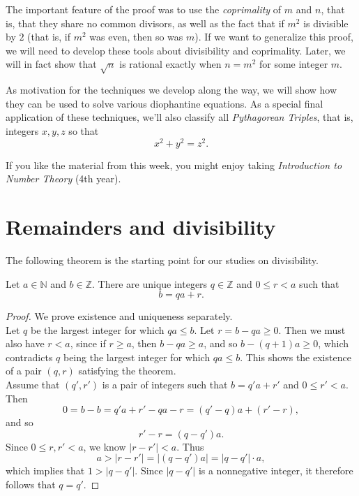 \documentclass[11pt,dvipsnames]{book}
\numberwithin{figure}{section} %
\numberwithin{table}{section} %
\begin{document}
The important feature of the proof was to use the {\it coprimality} of $m$ and $n$, that is, that they share no common divisors, as well as the fact that if $m^2$ is divisible by $2$ (that is, if $m^2$ was even, then so was $m$). If we want to generalize this proof, we will need to develop  these tools about divisibility and coprimality. Later, we will in fact show that $\sqrt{n}$ is rational exactly when $n=m^2$ for some integer $m$.

As motivation for the techniques we develop along the way, we will show how they can be used to solve various diophantine equations. As a special final application of these techniques, we'll also classify all {\it Pythagorean Triples}, that is, integers $x,y,z$ so that
\[
x^2+y^2=z^2.\]

If you like the material from this week, you might enjoy taking {\it Introduction to Number Theory} (4th year).

\section{Remainders and divisibility }

The following theorem is the starting point for our studies on divisibility.

\begin{theorem}
Let  $a\in\mathbb{N}$ and $b\in\mathbb{Z}$. There are unique integers $q\in \mathbb{Z}$ and $0\leq r<a$ such that
\[
b=qa+r.
\]
\end{theorem}

\begin{proof}
We prove existence and uniqueness separately. \\

 Let $q$ be the largest integer for which $qa\leq b$. Let $r=b-qa\geq 0$. Then we must also have $r<a$, since if $r\geq a$, then $b-qa\geq a$, and so $b-(q+1)a\geq 0$, which contradicts $q$ being the largest integer for which $qa\leq b$. This shows the existence of a pair $(q,r)$ satisfying the theorem. \\

 Assume that $(q',r')$ is a pair of integers such that $b=q'a+r'$ and $0\leq r'<a$.
Then
\[
0=b-b=q'a+r'-qa-r = (q'-q)a+(r'-r),
\]
and so
\[
r'-r=(q-q')a.
\]
Since $0\leq r,r'<a$, we know $|r-r'|<a$. Thus
\[
a>|r-r'|=|(q-q')a|=|q-q'|\cdot a,
\]
which implies that $1>|q-q'|$.
Since $|q-q'|$ is a nonnegative integer, it therefore follows that $q=q'$.
\end{proof}
\end{document}
